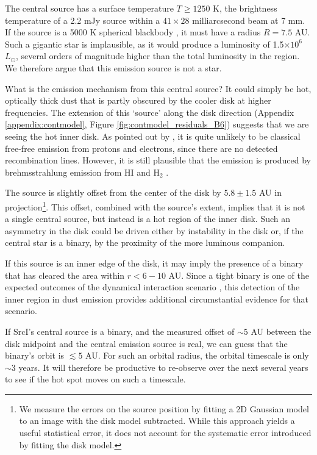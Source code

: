 \documentclass[twocolumn]{aastex61}
\newcommand{\lsun}{\ensuremath{L_{\odot}}\xspace}			%
\newcommand{\hh}{\ensuremath{\textrm{H}_{2}}\xspace}			%
\def\ee#1{\ensuremath{\times10^{#1}}}
\begin{document}
The central source has a surface temperature $T\geq1250$ K, the brightness
temperature of a 2.2 mJy source within a $41\times28$ milliarcsecond beam at 7
mm.  If the source is a 5000 K spherical blackbody \citep[e.g.,][]{Testi2010a},
it must have a radius $R=7.5$ AU.  Such a gigantic star is implausible, as it
would produce a luminosity of 1.5\ee{6} \lsun, several orders of magnitude
higher than the total luminosity in the region.  We therefore argue
that this emission source is not a star.

What is the emission mechanism from this central source?
It could simply be hot, optically thick dust that is partly obscured by the
cooler disk at higher frequencies.  The  extension of this `source' along the
disk direction (Appendix \ref{appendix:contmodel}, Figure
\ref{fig:contmodel_residuals_B6}) suggests that we are
seeing the hot inner disk.  As pointed out by \citet{Plambeck2016a}, it is
quite unlikely to be classical free-free emission from protons
and electrons, since there are no detected
recombination lines.  However, it is still plausible that the emission is
produced by brehmsstrahlung emission from HI and \hh
\citep{Reid2007a,Baez-Rubio2018a}.

The source is slightly offset from the center of the disk by $5.8\pm1.5$ AU in
projection\footnote{We measure the errors on the source position by fitting a
2D Gaussian model to an image with the disk model subtracted.  While this approach
yields a useful statistical error, it does not account for the systematic error
introduced by fitting the disk model. }.  This offset,
combined with the source's extent, implies that it is
not a single central source, but
instead is a hot region of the inner disk.  Such an asymmetry in the disk could
be driven either by instability in the disk or, if the central star is a
binary, by the proximity of the more luminous companion.

If this source is an inner edge of the disk, it may imply the presence of a
binary that has cleared the area within $r<6-10$ AU.  Since a tight binary is
one of the expected outcomes of the dynamical interaction scenario
\citep{Goddi2011b}, this
detection of the inner region in dust emission provides additional
circumstantial evidence for that scenario.

If SrcI's central source is a binary, and the measured offset of $\sim5$ AU
between the disk midpoint and the central emission source is real, we can guess
that the binary's orbit is $\lesssim5$ AU.  For such an orbital radius, the
orbital timescale is only $\sim3$ years.   It will therefore be productive to
re-observe \sourcei over the next several years to see if the hot spot moves on
such a timescale.
\end{document}

